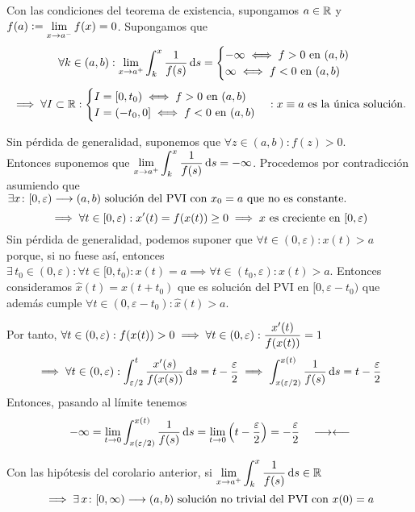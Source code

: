 \begin{cor}
	Con las condiciones del teorema de existencia, supongamos $\displaystyle a\in \mathbb{R}$ y\\
	$\displaystyle f(a)\vcentcolon= \lim_{x\to a^-} f(x)=0$. Supongamos que
	\[\forall k \in (a,b) : \lim_{x\to a^+}\int_{k}^{x} \frac{1}{f(s)} \odif{s} = \begin{cases}
			-\infty \iff f>0 \tex{ en } (a,b) \\
			\infty \iff f<0 \tex{ en } (a,b)
		\end{cases}\]
	\[\implies \forall I \subset \mathbb{R} : \begin{cases}
			I=[0, t_0) \iff f>0 \text{ en } (a,b) \\
			I=(-t_0, 0] \iff f<0 \text{ en } (a,b)
		\end{cases} : x\equiv a\text{ es la única solución.}\]
	\begin{dem}
		Sin pérdida de generalidad, suponemos que $\forall z \in (a,b) : f(z) > 0$. \\
		Entonces suponemos que $\ds \lim_{x\to a^+}\int_{k}^{x} \frac{1}{f(s)} \odif{s} = -\infty$. Procedemos por contradicción asumiendo que $\exists x \colon [0, \varepsilon) \longrightarrow (a,b) \text{ solución del PVI con } x_0 = a \text{ que no es constante.}$
		\[\implies \forall t \in [0, \varepsilon) : x'(t)=f(x(t)) \geq 0 \implies x \text{ es creciente en } [0, \varepsilon)\]
		Sin pérdida de generalidad, podemos suponer que $\forall t \in (0, \varepsilon) : x(t) > a$ porque, si no fuese así, entonces $\exists \, t_0 \in (0, \varepsilon) : \forall t \in [0, t_0) : x(t)=a \implies \forall t \in (t_0, \varepsilon) : x(t) > a$. Entonces consideramos $\hat{x}(t) = x(t + t_0)$ que es solución del PVI en $[0, \varepsilon - t_0)$ que además cumple $\forall t \in (0, \varepsilon - t_0) : \hat{x}(t) > a$.

		Por tanto, $\displaystyle \forall t \in (0, \varepsilon) : f(x(t)) > 0 \implies \forall t \in (0, \varepsilon) : \frac{x'(t)}{f(x(t))} = 1$
		\[\implies \forall t \in (0, \varepsilon) : \int_{\varepsilon/2}^{t} \frac{x'(s)}{f(x(s))} \odif{s} = t -\frac{\varepsilon}{2} \implies \int_{x(\varepsilon/2)}^{x(t)} \frac{1}{f(s)} \odif{s} = t -\frac{\varepsilon}{2}\]
		Entonces, pasando al límite tenemos
		\[-\infty = \lim_{t\to 0} \int_{x(\varepsilon/2)}^{x(t)} \frac{1}{f(s)} \odif{s} = \lim_{t\to 0} \left(t - \frac{\varepsilon}{2}\right) = - \frac{\varepsilon}{2} \quad \contr\]
	\end{dem}
\end{cor}

\begin{cor}
	Con las hipótesis del corolario anterior, si $\ds \lim_{x\to a^+} \int_{k}^{x} \frac{1}{f(s)} \odif{s} \in \R$ \[\implies \exists \, x \colon [0, \infty) \longrightarrow (a,b) \text{ solución no trivial del PVI con } x(0) = a\]
\end{cor}

